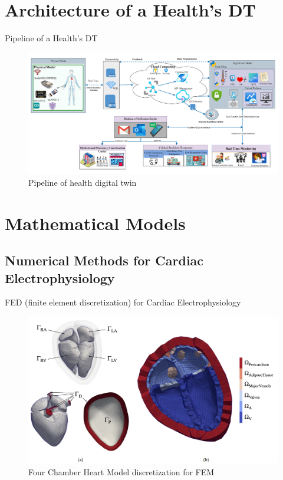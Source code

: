 \documentclass{beamer}
\begin{document}
\section{Architecture of a Health's DT}
\begin{frame}{Pipeline of a Health's DT}
    \begin{figure}
    \centering
    \includegraphics[width=1\linewidth]{images/Architecture_health_dt.png}
    \caption{Pipeline of health digital twin}
    \label{fig:PipelineHealthDT}
\end{figure}
\end{frame}

\section{Mathematical Models}

\subsection{Numerical Methods for Cardiac Electrophysiology}
\begin{frame}{FED (finite element discretization) for Cardiac Electrophysiology \textcite{gerach2021electro}}
  \begin{figure}
    \centering
    \includegraphics[width=0.8\linewidth]{images/heart_discretization.png}
    \caption{Four Chamber Heart Model discretization for FEM}
    \label{fig:heart_discretization}
\end{figure}
\end{frame}
\end{document}
